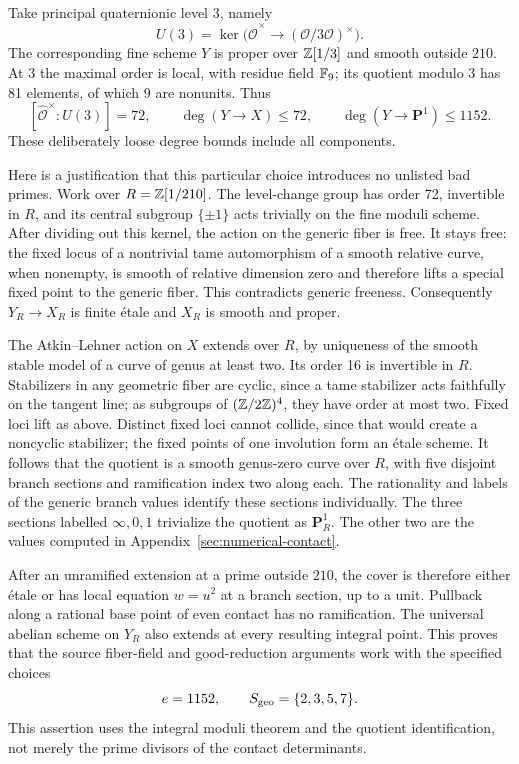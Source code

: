 \documentclass[11pt]{article}
\theoremstyle{definition}
\begin{document}
Take principal quaternionic level 3, namely
\[
 U(3)=\ker\bigl(\widehat{\mathcal O}^{\times}
                  \longrightarrow(\mathcal O/3\mathcal O)^{\times}\bigr).
\]
The corresponding fine scheme \(Y\) is proper over \(\mathbb Z[1/3]\)
and smooth outside \(210\). At 3 the maximal order is local, with
residue field \(\mathbb F_9\); its quotient modulo 3 has 81 elements,
of which 9 are nonunits. Thus
\[
 [\widehat{\mathcal O}^{\times}:U(3)]=72,
 \qquad \deg(Y\longrightarrow X)\le72,
 \qquad \deg(Y\longrightarrow\mathbf P^1)\le1152.
\]
These deliberately loose degree bounds include all components.

Here is a justification that this particular choice introduces no
unlisted bad primes. Work over \(R=\mathbb Z[1/210]\). The level-change
group has order 72, invertible in \(R\), and its central subgroup
\(\{\pm1\}\) acts trivially on the fine moduli scheme. After
dividing out this kernel, the action on the generic fiber is free.
It stays free: the fixed locus of a nontrivial tame automorphism of
a smooth relative curve, when nonempty, is smooth of relative
dimension zero and therefore lifts a special fixed point to the
generic fiber. This contradicts generic freeness. Consequently
\(Y_R\to X_R\) is finite \'etale and \(X_R\) is smooth and proper.

The Atkin--Lehner action on \(X\) extends over \(R\), by uniqueness
of the smooth stable model of a curve of genus at least two. Its
order 16 is invertible in \(R\). Stabilizers in any geometric
fiber are cyclic, since a tame stabilizer acts faithfully on the
tangent line; as subgroups of \((\mathbb Z/2\mathbb Z)^4\), they have order at
most two. Fixed loci lift as above. Distinct fixed loci cannot
collide, since that would create a noncyclic stabilizer; the fixed
points of one involution form an \'etale scheme. It follows that
the quotient is a smooth genus-zero curve over \(R\), with five
disjoint branch sections and ramification index two along each.
The rationality and labels of the generic branch values identify
these sections individually. The three sections labelled
\(\infty,0,1\) trivialize the quotient as \(\mathbf P^1_R\).
The other two are the values computed in
Appendix~\ref{sec:numerical-contact}.

After an unramified extension at a prime outside \(210\), the
cover is therefore either \'etale or has local equation
\(w=u^2\) at a branch section, up to a unit. Pullback along a
rational base point of even contact has no ramification. The
universal abelian scheme on \(Y_R\) also extends at every resulting
integral point. This proves that the source fiber-field and
good-reduction arguments work with the specified choices
\begin{equation}\label{eq:geometric-data}
                 e=1152,\qquad S_{\rm geo}=\{2,3,5,7\}.
\end{equation}
This assertion uses the integral moduli theorem and the quotient
identification, not merely the prime divisors of the contact
determinants.
\end{document}
